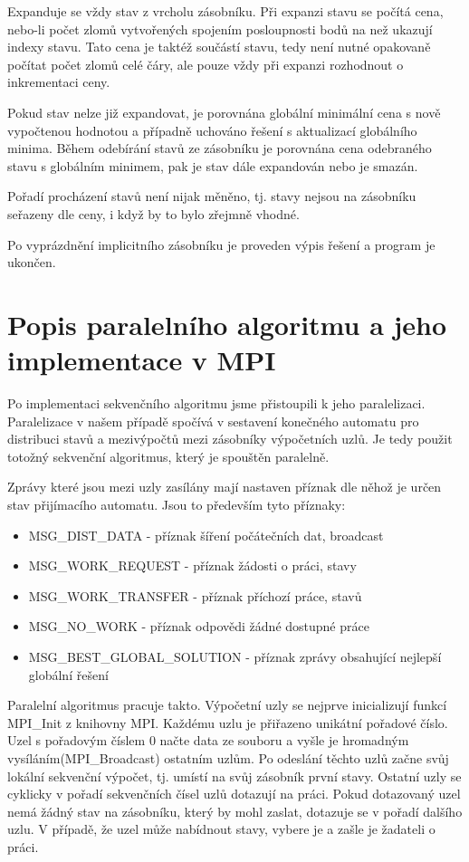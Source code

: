 \documentclass[12pt]{article}
\begin{document}
Expanduje se vždy stav z vrcholu zásobníku. Při expanzi stavu se počítá cena, nebo-li počet zlomů vytvořených spojením posloupnosti bodů na než ukazují indexy stavu. Tato cena je taktéž součástí stavu, tedy není nutné opakovaně počítat počet zlomů celé čáry, ale pouze vždy při expanzi rozhodnout o inkrementaci ceny.

Pokud stav nelze již expandovat, je porovnána globální minimální cena s nově vypočtenou hodnotou a případně uchováno řešení s aktualizací globálního minima. Během odebírání stavů ze zásobníku je porovnána cena odebraného stavu s globálním minimem, pak je stav dále expandován nebo je smazán.

Pořadí procházení stavů není nijak měněno, tj. stavy nejsou na zásobníku seřazeny dle ceny, i když by to bylo zřejmně vhodné.

Po vyprázdnění implicitního zásobníku je proveden výpis řešení a program je ukončen.


\section{Popis paralelního algoritmu a jeho implementace v MPI}

Po implementaci sekvenčního algoritmu jsme přistoupili k jeho paralelizaci. Paralelizace v našem případě spočívá v sestavení  konečného automatu pro distribuci stavů a mezivýpočtů mezi zásobníky výpočetních uzlů. Je tedy použit totožný sekvenční algoritmus, který je spouštěn paralelně.

Zprávy které jsou mezi uzly zasílány mají nastaven příznak dle něhož je určen stav přijímacího automatu. Jsou to především tyto příznaky:
\begin{itemize}
\item MSG\_DIST\_DATA - příznak šíření počátečních dat, broadcast
\item MSG\_WORK\_REQUEST - příznak žádosti o práci, stavy
\item MSG\_WORK\_TRANSFER - příznak příchozí práce, stavů
\item MSG\_NO\_WORK - příznak odpovědi žádné dostupné práce
\item MSG\_BEST\_GLOBAL\_SOLUTION - příznak zprávy obsahující nejlepší globální řešení
\end{itemize}

Paralelní algoritmus pracuje takto. Výpočetní uzly se nejprve inicializují funkcí MPI\_Init z knihovny MPI. Každému uzlu je přiřazeno unikátní pořadové číslo. Uzel s pořadovým číslem 0 načte data ze souboru a vyšle je hromadným vysíláním(MPI\_Broadcast) ostatním uzlům. Po odeslání těchto uzlů začne svůj lokální sekvenční výpočet, tj. umístí na svůj zásobník první stavy. Ostatní uzly se cyklicky v pořadí sekvenčních čísel uzlů dotazují na práci. Pokud dotazovaný uzel nemá žádný stav na zásobníku, který by mohl zaslat, dotazuje se v pořadí dalšího uzlu. V případě, že uzel může nabídnout stavy, vybere je a zašle je žadateli o práci. 
\end{document}
